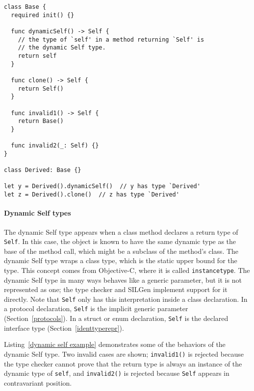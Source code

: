 \documentclass[../generics]{subfiles}
\begin{document}
\begin{listing}\label{dynamic self example}
\begin{Verbatim}
class Base {
  required init() {}
  
  func dynamicSelf() -> Self {
    // the type of `self' in a method returning `Self' is
    // the dynamic Self type.
    return self
  }

  func clone() -> Self {
    return Self()
  }
  
  func invalid1() -> Self {
    return Base()
  }
  
  func invalid2(_: Self) {}
}

class Derived: Base {}

let y = Derived().dynamicSelf()  // y has type `Derived'
let z = Derived().clone()  // z has type `Derived'
\end{Verbatim}
\end{listing}

\paragraph{Dynamic Self types}
The dynamic Self type appears when a class method declares a return type of \texttt{Self}. In this case, the object is known to have the same dynamic type as the base of the method call, which might be a subclass of the method's class. The dynamic Self type wraps a class type, which is the static upper bound for the type. This concept comes from Objective-C, where it is called \texttt{instancetype}. The dynamic Self type in many ways behaves like a generic parameter, but it is not represented as one; the type checker and SILGen implement support for it directly. Note that \texttt{Self} only has this interpretation inside a class declaration. In a protocol declaration, \texttt{Self} is the implicit generic parameter (Section~\ref{protocols}). In a struct or enum declaration, \texttt{Self} is the declared interface type (Section~\ref{identtyperepr}).

Listing~\ref{dynamic self example} demonstrates some of the behaviors of the dynamic Self type. Two invalid cases are shown; \texttt{invalid1()} is rejected because the type checker cannot prove that the return type is always an instance of the dynamic type of \texttt{self}, and \texttt{invalid2()} is rejected because \texttt{Self} appears in contravariant position.
\end{document}
